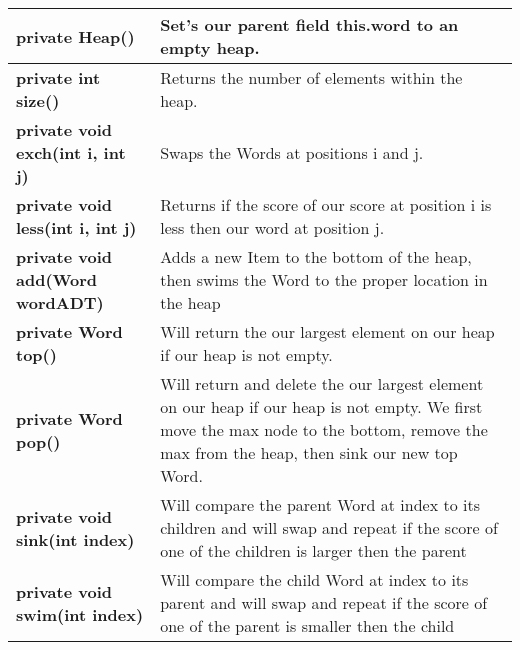 \documentclass[11pt]{article}
\begin{document}
\begin{tabular}{|p{}|p{}|}
\hline
%
\textbf{private Heap()} & Set's our parent field this.word to an empty heap.\\
%
\hline
\textbf{private int size()} & Returns the number of elements within the heap.\\
%
\hline 
\textbf{private void exch(int i, int j)} & Swaps the Words at positions i and j.\\
%
\hline
\textbf{private void less(int i, int j)} & Returns if the score of our score at position i is less then our word at position j.\\
%
\hline
\textbf{private void add(Word wordADT)} & Adds a new Item to the bottom of the heap, then swims the Word to the proper location in the heap\\
%
\hline
\textbf{private Word top()} & Will return the our largest element on our heap if our heap is not empty.\\
%
\hline
\textbf{private Word pop()} & Will return and delete the our largest element on our heap if our heap is not empty. We first move the max node to the bottom, remove the max from the heap, then sink our new top Word.\\
%
\hline
\textbf{private void sink(int index)} & Will compare the parent Word at index to its children and will swap and repeat if the score of one of the children is larger then the parent\\
%
\hline
\textbf{private void swim(int index)} & Will compare the child Word at index to its parent and will swap and repeat if the score of one of the parent is smaller then the child\\
\hline
\end{tabular}

\end{document}
